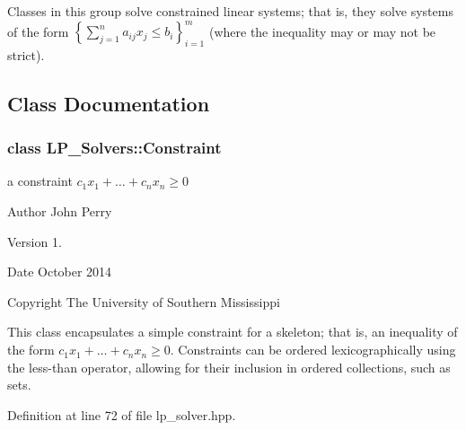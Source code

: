 Classes in this group solve constrained linear systems; that is, they solve systems of the form $\left\{\sum_{j=1}^na_{ij}x_j\leq b_i\right\}_{i=1}^m$ (where the inequality may or may not be strict). 

\subsection{Class Documentation}
\label{class_l_p___solvers_1_1_constraint}
\subsubsection{class L\+P\+\_\+\+Solvers\+:\+:Constraint}
a constraint $ c_1 x_1 + \ldots + c_n x_n \geq 0 $ 

\begin{DoxyAuthor}{Author}
John Perry 
\end{DoxyAuthor}
\begin{DoxyVersion}{Version}
1. 
\end{DoxyVersion}
\begin{DoxyDate}{Date}
October 2014 
\end{DoxyDate}
\begin{DoxyCopyright}{Copyright}
The University of Southern Mississippi
\end{DoxyCopyright}
This class encapsulates a simple constraint for a skeleton; that is, an inequality of the form $ c_1 x_1 + \ldots + c_n x_n \geq 0 $. Constraints can be ordered lexicographically using the less-\/than operator, allowing for their inclusion in ordered collections, such as sets. 

Definition at line 72 of file lp\+\_\+solver.\+hpp.


